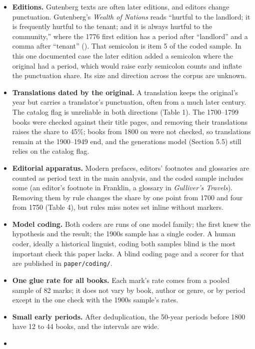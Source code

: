 \documentclass[
  11pt,
]{article}
\providecommand{\tightlist}{%
  \setlength{\itemsep}{0pt}\setlength{\parskip}{0pt}}
\begin{document}
\begin{itemize}
\tightlist
\item
  \textbf{Editions.} Gutenberg texts are often later editions, and editors change punctuation. Gutenberg's \emph{Wealth of Nations} reads ``hurtful to the landlord; it is frequently hurtful to the
  tenant; and it is always hurtful to the community,'' where the 1776 first edition has a period after ``landlord'' and a comma after ``tenant'' (). That semicolon
  is item 5 of the coded sample. In this one documented case the later edition added a semicolon where the original had a period, which would raise early semicolon counts and inflate the punctuation
  share. Its size and direction across the corpus are unknown.
\item
  \textbf{Translations dated by the original.} A translation keeps the original's year but carries a translator's punctuation, often from a much later century. The catalog flag is unreliable in both
  directions (Table 1). The 1700--1799 books were checked against their title pages, and removing their translations raises the share to 45\%; books from 1800 on were not checked, so translations
  remain at the 1900--1949 end, and the generations model (Section 5.5) still relies on the catalog flag.
\item
  \textbf{Editorial apparatus.} Modern prefaces, editors' footnotes and glossaries are counted as period text in the main analysis, and the coded sample includes some (an editor's footnote in
  Franklin, a glossary in \emph{Gulliver's Travels}). Removing them by rule changes the share by one point from 1700 and four from 1750 (Table 4), but rules miss notes set inline without markers.
\item
  \textbf{Model coding.} Both coders are runs of one model family; the first knew the hypothesis and the result; the 1900s sample has a single coder. A human coder, ideally a historical linguist,
  coding both samples blind is the most important check this paper lacks. A blind coding page and a scorer for that are published in \texttt{paper/coding/}.
\item
  \textbf{One glue rate for all books.} Each mark's rate comes from a pooled sample of 82 marks; it does not vary by book, author or genre, or by period except in the one check with the 1900s sample's
  rates.
\item
  \textbf{Small early periods.} After deduplication, the 50-year periods before 1800 have 12 to 44 books, and the intervals are wide.
\item

\end{itemize}
\end{document}
